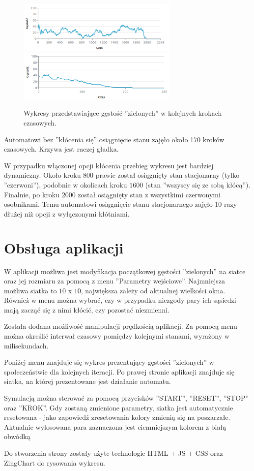 \documentclass[12pt]{article}
\begin{document}
\begin{figure}[H]
\centering
\includegraphics[width=0.7\textwidth]{stacjonarny_niezgoda_wykres.png} 
\includegraphics[width=0.7\textwidth]{stacjonarny_niezgoda_wykres_bezk.png}
\caption{Wykresy przedstawiające gęstość ''zielonych'' w kolejnych krokach czasowych.}
\end{figure}

Automatowi bez ''kłócenia się'' osiągnięcie stanu zajęło około 170 kroków czasowych. Krzywa jest raczej gładka.

W przypadku włączonej opcji kłócenia przebieg wykresu jest bardziej dynamiczny. Około kroku $800$ prawie został osiągnięty stan stacjonarny (tylko ''czerwoni''), podobnie w okolicach kroku $1600$ (stan ''wszyscy się ze sobą kłócą''). Finalnie, po kroku $2000$ został osiągnięty stan z wszystkimi czerwonymi osobnikami. Temu automatowi osiągnięcie stanu stacjonarnego zajęło 10 razy dłużej niż opcji z wyłączonymi kłótniami.

\section{Obsługa aplikacji}
W aplikacji możliwa jest modyfikacja początkowej gęstości ''zielonych'' na siatce oraz jej rozmiaru za pomocą z menu ''Parametry wejściowe''. Najmniejsza możliwa siatka to $10$ x $10$, największa zależy od aktualnej wielkości okna. Również w menu można wybrać, czy w przypadku niezgody pary ich sąsiedzi mają zacząć się z nimi kłócić, czy pozostać niezmienni.

Została dodana możliwość manipulacji prędkością aplikacji. Za pomocą menu można określić interwał czasowy pomiędzy kolejnymi stanami, wyrażony w milisekundach.

Poniżej menu znajduje się wykres prezentujący gęstości ''zielonych'' w społeczeństwie dla kolejnych iteracji. Po prawej stronie aplikacji znajduje się siatka, na której prezentowane jest działanie automatu.

Symulacją można sterować za pomocą przycisków ''START'', ''RESET'', ''STOP'' oraz ''KROK''. Gdy zostaną zmienione parametry, siatka jest automatycznie resetowana - jako zapowiedź zresetowania kolory zmienią się na poszarzałe. Aktualnie wylosowana para zaznaczona jest ciemniejszym kolorem z białą obwódką

Do stworzenia strony zostały użyte technologie HTML + JS + CSS oraz ZingChart do rysowania wykresu.
\end{document}
